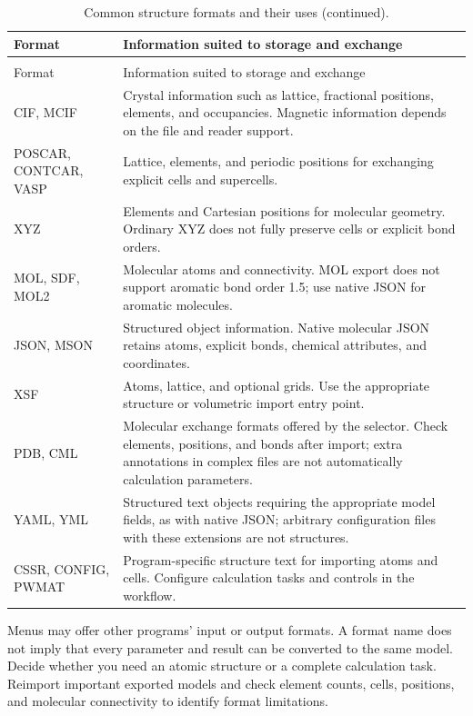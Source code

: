 \begin{longtable}{>{\raggedright\arraybackslash}p{.34\linewidth}>{\raggedright\arraybackslash}p{}}
\caption{Common structure formats and their uses.}\\
\toprule
Format & Information suited to storage and exchange \\
\midrule
\endfirsthead
\caption[]{Common structure formats and their uses (continued).}\\
\toprule
Format & Information suited to storage and exchange \\
\midrule
\endhead
\bottomrule
\endfoot
\bottomrule
\endlastfoot
CIF, MCIF & Crystal information such as lattice, fractional positions, elements, and occupancies. Magnetic information depends on the file and reader support.\\
POSCAR, CONTCAR, VASP & Lattice, elements, and periodic positions for exchanging explicit cells and supercells.\\
XYZ & Elements and Cartesian positions for molecular geometry. Ordinary XYZ does not fully preserve cells or explicit bond orders.\\
MOL, SDF, MOL2 & Molecular atoms and connectivity. MOL export does not support aromatic bond order 1.5; use native JSON for aromatic molecules.\\
JSON, MSON & Structured object information. Native molecular JSON retains atoms, explicit bonds, chemical attributes, and coordinates.\\
XSF & Atoms, lattice, and optional grids. Use the appropriate structure or volumetric import entry point.\\
PDB, CML & Molecular exchange formats offered by the selector. Check elements, positions, and bonds after import; extra annotations in complex files are not automatically calculation parameters.\\
YAML, YML & Structured text objects requiring the appropriate model fields, as with native JSON; arbitrary configuration files with these extensions are not structures.\\
CSSR, CONFIG, PWMAT & Program-specific structure text for importing atoms and cells. Configure calculation tasks and controls in the workflow.\\
\end{longtable}

Menus may offer other programs' input or output formats. A format name does not imply that every parameter and result can be converted to the same model. Decide whether you need an atomic structure or a complete calculation task. Reimport important exported models and check element counts, cells, positions, and molecular connectivity to identify format limitations.

